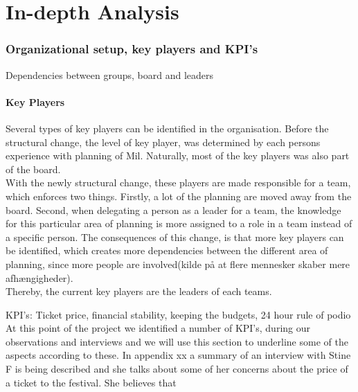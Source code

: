\part{In-depth Analysis}

\section{Organizational setup, key players and KPI's}
Dependencies between groups, board and leaders\\
\subsection{Key Players}
Several types of key players can be identified in the organisation. Before the structural change, the level of key player, was determined by each persons experience with planning of Mil. Naturally, most of the key players was also part of the board.\\
With the newly structural change, these players are made responsible for a team, which enforces two things. Firstly, a lot of the planning are moved away from the board. Second, when delegating a person as a leader for a team, the knowledge for this particular area of planning is more assigned to a role in a team instead of a specific person. The consequences of this change, is that more key players can be identified, which creates more dependencies between the different area of planning, since more people are involved(kilde på at flere mennesker skaber mere afhængigheder).\\
Thereby, the current key players are the leaders of each teams. 


KPI's: Ticket price, financial stability, keeping the budgets, 24 hour rule of podio\\

At this point of the project we identified a number of KPI's, during our observations and interviews and we will use this section to underline some of the aspects according to these.
In appendix xx a summary of an interview with Stine F is being described and she talks about some of her concerns about the price of a ticket to the festival. She believes that \\
